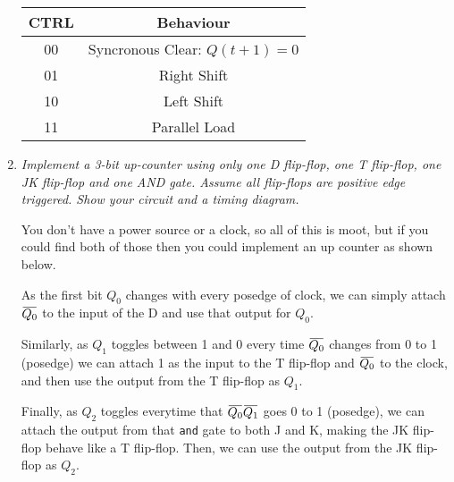 \documentclass[12pt]{article}
\newcommand{\overbar}[1]
    {\mkern1.5mu\overline{\mkern-1.5mu#1\mkern-1.5mu}\mkern1.5mu}
\begin{document}
\begin{enumerate}
\begin{center}
    \end{center}

    \begin{center}
      \begin{tabular}{c | c}
        CTRL & Behaviour \\
        \hline
        00 & Syncronous Clear: $Q(t+1) = 0$ \\
        01 & Right Shift \\
        10 & Left Shift \\
        11 & Parallel Load
      \end{tabular}
    \end{center}

  \item \textit{Implement a 3-bit up-counter using only one D flip-flop, one
                T flip-flop, one JK flip-flop and one AND gate. Assume all
                flip-flops are positive edge triggered. Show your circuit and
                a timing diagram.}

    You don't have a power source or a clock, so all of this is moot, but
      if you could find both of those then you could implement an up counter
      as shown below.

    As the first bit $Q_0$ changes with every posedge of clock, we can simply
      attach $\overbar{Q_0}$ to the input of the D and use that output for
      $Q_0$.

    Similarly, as $Q_1$ toggles between 1 and 0 every time
      $\overbar{Q_0}$ changes from 0 to 1 (posedge) we can attach 1 as the input
      to the T flip-flop and $\overbar{Q_0}$ to the clock, and then use the
      output from the T flip-flop as $Q_1$.

    Finally, as $Q_2$ toggles everytime that $\overbar{Q_0}\overbar{Q_1}$ goes
      0 to 1 (posedge), we can attach the output from that {\tt and} gate to
      both J and K, making the JK flip-flop behave like a T flip-flop. Then, we
      can use the output from the JK flip-flop as $Q_2$.


\end{enumerate}
\end{document}
